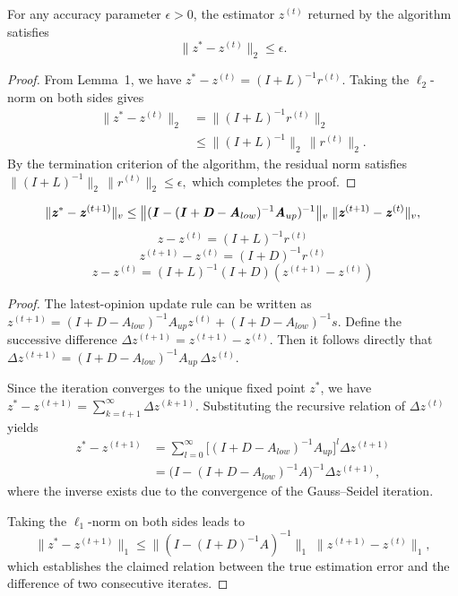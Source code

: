 \documentclass[sigconf,review, nonacm]{acmart}
\newcommand\rr{\boldsymbol{\mathit{r}}}
\newcommand\s{\boldsymbol{\mathit{s}}}
\newcommand\zz{\boldsymbol{\mathit{z}}}
\renewcommand\AA{\boldsymbol{\mathit{A}}}
\newcommand\DD{\boldsymbol{\mathit{D}}}
\newcommand\II{\boldsymbol{\mathit{I}}}
\newcommand\LL{\boldsymbol{\mathit{L}}}
\begin{document}
\begin{theorem}
For any accuracy parameter $\epsilon > 0$, the estimator $\zz^{(t)}$ returned by the algorithm satisfies
\begin{equation}
\|\zz^{*}-\zz^{(t)}\|_2 \leq \epsilon.
\end{equation}
\end{theorem}

\begin{proof}
From Lemma~1, we have
\(
\zz^{*}-\zz^{(t)} = (\II+\LL)^{-1}\rr^{(t)}.
\)
Taking the $\ell_2$-norm on both sides gives
\begin{align}
\|\zz^{*}-\zz^{(t)}\|_2
&= \|(\II+\LL)^{-1}\rr^{(t)}\|_2 \nonumber \\
&\leq \|(\II+\LL)^{-1}\|_2 \, \|\rr^{(t)}\|_2.
\end{align}
By the termination criterion of the algorithm, the residual norm satisfies
\(
\|(\II+\LL)^{-1}\|_2 \, \|\rr^{(t)}\|_2 \leq \epsilon,
\)
which completes the proof.
\end{proof}

\begin{lemma}
	\begin{equation}
		\|\zz^{*}-\zz^{(t+1)}\|_v 
		\leq 
		\bigl\|(\II-(\II+\DD-\AA_{low})^{-1}\AA_{up})^{-1}\bigr\|{\scriptsize {\tiny {\tiny {\scriptsize {\scriptsize }}}}}_v
		\;\|\zz^{(t+1)}-\zz^{(t)}\|_v,
	\end{equation}
	\[
	\zz-\zz^{(t)}=(\II+\LL)^{-1}\rr^{(t)}
	\]
	\[
	\zz^{(t+1)}-\zz^{(t)}=(\II+\DD)^{-1}\rr^{(t)}
	\]
	\[
	\zz-\zz^{(t)}=(\II+\LL)^{-1}(\II+\DD)(\zz^{(t+1)}-\zz^{(t)})
	\]
\end{lemma}
\begin{proof}
	The latest-opinion update rule can be written as
	$\zz^{(t+1)} = (\II+\DD-\AA_{low})^{-1}\AA_{up} \zz^{(t)} + (\II+\DD-\AA_{low})^{-1}\s.$
	Define the successive difference $\Delta\zz^{(t+1)} = \zz^{(t+1)}-\zz^{(t)}$.  
	Then it follows directly that
	$\Delta\zz^{(t+1)} = (\II+\DD-\AA_{low})^{-1}\AA_{up}\,\Delta\zz^{(t)}.$
	
	Since the iteration converges to the unique fixed point $\zz^{*}$, we have
	$\zz^{*}-\zz^{(t+1)} 
	= \sum_{k=t+1}^{\infty} \Delta\zz^{(k+1)}.$
	Substituting the recursive relation of $\Delta\zz^{(t)}$ yields
	\begin{align}
		\zz^{*}-\zz^{(t+1)}
		&= \sum_{l=0}^{\infty} \bigl[(\II+\DD-\AA_{low})^{-1}\AA_{up}\bigr]^l \Delta\zz^{(t+1)} \nonumber \\
		&= \bigl(\II-(\II+\DD-\AA_{low})^{-1}\AA\bigr)^{-1} \Delta\zz^{(t+1)},
	\end{align}
	where the inverse exists due to the convergence of the Gauss--Seidel iteration.
	
	Taking the $\ell_1$-norm on both sides leads to
	\begin{equation}
		\|\zz^{*}-\zz^{(t+1)}\|_1
		\leq
		\bigl\|(\II-(\II+\DD)^{-1}\AA)^{-1}\bigr\|_1
		\;\|\zz^{(t+1)}-\zz^{(t)}\|_1,
	\end{equation}
	which establishes the claimed relation between the true estimation error and the difference of two consecutive iterates.
\end{proof}
\end{document}
